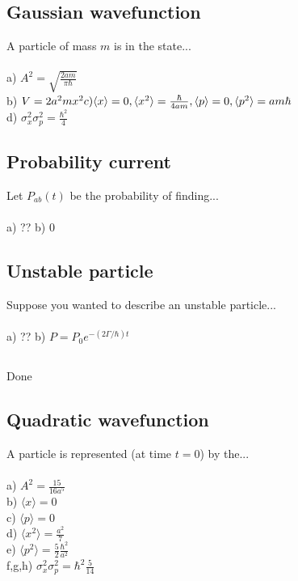 \documentclass{article}
\newcommand{\<}{\langle}
\renewcommand{\>}{\rangle}
\begin{document}
\subsection{}
\subsection{}
\subsection{Gaussian wavefunction}
A particle of mass $m$ is in the state...
\\ \\
a) $A^2 = \sqrt{\frac{2am}{\pi \hbar}}$ \\
b) $V = 2a^2mx^2 \\
c) \<x\> = 0, \<x^2\> = \frac{\hbar}{4am}, \<p\> = 0, \<p^2\> = am\hbar$ \\
d) $\sigma_x^2 \sigma_p^2 = \frac{\hbar^2}{4}$
\subsection{}
\subsection{}
\subsection{}
\subsection{}
\subsection{Probability current}
Let $P_{ab}(t)$ be the probability of finding...
\\ \\
a) ?? b) 0
\subsection{Unstable particle}
Suppose you wanted to describe an unstable particle...
\\ \\
a) ?? b) $P = P_0 e^{-(2\Gamma / \hbar) t}$
\subsection{}
Done
\subsection{Quadratic wavefunction}
A particle is represented (at time $t = 0$) by the...
\\ \\
a) $A^2 = \frac{15}{16 a^5}$ \\
b) $\<x\> = 0$ \\
c) $\<p\> = 0$ \\
d) $\<x^2\> = \frac{a^2}{7}$ \\
e) $\<p^2\> = \frac{5}{2} \frac{\hbar^2}{a^2}$ \\
f,g,h) $\sigma_x^2 \sigma_p^2 = \hbar^2 \frac{5}{14}$
\end{document}
